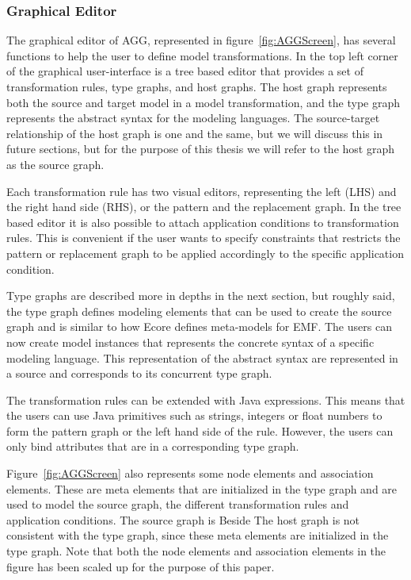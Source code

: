\subsubsection*{Graphical Editor}
The graphical editor of AGG, represented in figure~\ref{fig:AGGScreen}, has
several functions to help the user to define model transformations. In the top
left corner of the graphical user-interface is a tree based editor that provides
a set of transformation rules, type graphs, and host graphs. The host graph
represents both the source and target model in a model transformation, and the
type graph represents the abstract syntax for the modeling languages. The
source-target relationship of the host graph is one and the same, but we will
discuss this in future sections, but for the purpose of this thesis we will
refer to the host graph as the source graph.

Each transformation rule has two visual editors, representing the left
(LHS) and the right hand side (RHS), or the pattern and the replacement graph.
In the tree based editor it is also possible to attach application conditions to
transformation rules. This is convenient if the user wants to specify
constraints that restricts the pattern or replacement graph to be applied
accordingly to the specific application condition.

Type graphs are described more in depths in the next section, but roughly said,
the type graph defines modeling elements that can be used to create the source
graph and is similar to how Ecore defines meta-models for EMF. The users can
now create model instances that represents the concrete syntax of a specific
modeling language. This representation of the abstract syntax are represented
in a source and corresponds to its concurrent type graph.

The transformation rules can be extended with Java expressions. This means that
the users can use Java primitives such as strings, integers or float numbers to
form the pattern graph or the left hand side of the rule. However, the users
can only bind attributes that are in a corresponding type graph.

Figure~\ref{fig:AGGScreen} also represents some node elements and association
elements. These are meta elements that are initialized in the type graph and
are used to model the source graph, the different transformation rules and
application conditions. The source graph is Beside The host graph is not
consistent with the type graph, since these meta elements are initialized in
the type graph. Note that both the node elements and association elements in
the figure has been scaled up for the purpose of this paper.

